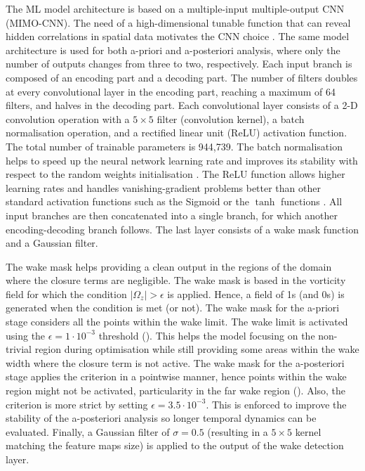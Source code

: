 \documentclass[../main.tex]{subfiles}
\begin{document}
The ML model architecture is based on a multiple-input multiple-output CNN (MIMO-CNN). 
The need of a high-dimensional tunable function that can reveal hidden correlations in spatial data motivates the CNN choice \citep{LeCun1989}.
The same model architecture is used for both a-priori and a-posteriori analysis, where only the number of outputs changes from three to two, respectively.
Each input branch is composed of an encoding part and a decoding part.
The number of filters doubles at every convolutional layer in the encoding part, reaching a maximum of 64 filters, and halves in the decoding part.
Each convolutional layer consists of a 2-D convolution operation with a $5\times5$ filter (convolution kernel), a batch normalisation operation, and a rectified linear unit (ReLU) activation function.
The total number of trainable parameters is 944,739.
The batch normalisation helps to speed up the neural network learning rate and improves its stability with respect to the random weights initialisation \citep{Ioffe2015}. 
The ReLU function allows higher learning rates and handles vanishing-gradient problems better than other standard activation functions such as the Sigmoid or the $\tanh$ functions \citep{Nair2010}.
All input branches are then concatenated into a single branch, for which another encoding-decoding branch follows.
The last layer consists of a wake mask function and a Gaussian filter.

The wake mask helps providing a clean output in the regions of the domain where the closure terms are negligible.
The wake mask is based in the vorticity field for which the condition $|\Omega_z|>\epsilon$ is applied.
Hence, a field of 1s (and 0s) is generated when the condition is met (or not).
The wake mask for the a-priori stage considers all the points within the wake limit.
The wake limit is activated using the $\epsilon=1\cdot10^{-3}$ threshold ().
This helps the model focusing on the non-trivial region during optimisation while still providing some areas within the wake width where the closure term is not active.
The wake mask for the a-posteriori stage applies the criterion in a pointwise manner, hence points within the wake region might not be activated, particularity in the far wake region ().
Also, the criterion is more strict by setting $\epsilon=3.5\cdot10^{-3}$.
This is enforced to improve the stability of the a-posteriori analysis so longer temporal dynamics can be evaluated.
Finally, a Gaussian filter of $\sigma=0.5$ (resulting in a $5\times5$ kernel matching the feature maps size) is applied to the output of the wake detection layer.
\end{document}
